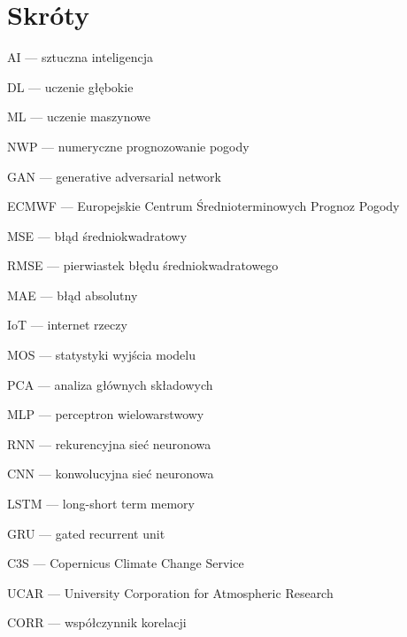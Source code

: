 \documentclass{article}
\begin{document}
\section*{Skróty}

\raggedright{}

AI — sztuczna inteligencja

DL — uczenie głębokie

ML — uczenie maszynowe

NWP — numeryczne prognozowanie pogody

GAN — generative adversarial network

ECMWF — Europejskie Centrum Średnioterminowych Prognoz Pogody

MSE — błąd średniokwadratowy

RMSE — pierwiastek błędu średniokwadratowego

MAE — błąd absolutny

IoT — internet rzeczy

MOS — statystyki wyjścia modelu

PCA — analiza głównych składowych

MLP — perceptron wielowarstwowy

RNN — rekurencyjna sieć neuronowa

CNN — konwolucyjna sieć neuronowa

LSTM — long-short term memory

GRU — gated recurrent unit

C3S — Copernicus Climate Change Service

UCAR — University Corporation for Atmospheric Research

CORR — współczynnik korelacji

\pagebreak
\printbibliography[title={Bibliografia}]\label{sec:bibliography}
% 

\pagebreak

\listoftables

\listoffigures

\pagebreak
\end{document}
